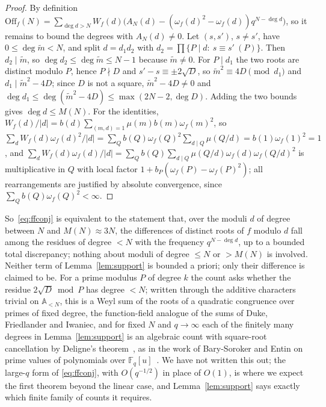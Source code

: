 \documentclass[11pt,a4paper]{article}
\theoremstyle{remark}\newtheorem{remark}[theorem]{Remark}
\newcommand{\F}{\mathbb{F}}
\newcommand{\A}{\mathbb{A}}
\begin{document}
\begin{proof}
By definition $\mathrm{Off}_f(N)=\sum_{\deg d>N}W_f(d)\bigl(A_N(d)-(\omega_f(d)^2-\omega_f(d))q^{N-\deg d}\bigr)$,
so it remains to bound the degrees with $A_N(d)\ne0$. Let $(s,s')$, $s\ne s'$, have $0\le\deg\tilde m<N$,
and split $d=d_1d_2$ with $d_2=\prod\{P\mid d:\ s\equiv s'\ (P)\}$. Then $d_2\mid\tilde m$, so
$\deg d_2\le\deg\tilde m\le N-1$ because $\tilde m\ne0$. For $P\mid d_1$ the two roots are distinct modulo
$P$, hence $P\nmid D$ and $s'-s\equiv\pm2\sqrt D$, so $\tilde m^2\equiv4D\pmod{d_1}$ and
$d_1\mid\tilde m^2-4D$; since $D$ is not a square, $\tilde m^2-4D\ne0$ and
$\deg d_1\le\deg(\tilde m^2-4D)\le\max(2N-2,\deg D)$. Adding the two bounds gives $\deg d\le M(N)$. For
the identities, $W_f(d)/|d|=b(d)\sum_{(m,d)=1}\mu(m)b(m)\omega_f(m)^2$, so
$\sum_dW_f(d)\omega_f(d)^2/|d|=\sum_Qb(Q)\omega_f(Q)^2\sum_{d\mid Q}\mu(Q/d)=b(1)\omega_f(1)^2=1$, and
$\sum_dW_f(d)\omega_f(d)/|d|=\sum_Qb(Q)\sum_{d\mid Q}\mu(Q/d)\omega_f(d)\omega_f(Q/d)^2$ is multiplicative
in $Q$ with local factor $1+b_P(\omega_f(P)-\omega_f(P)^2)$; all rearrangements are justified by absolute
convergence, since $\sum_Qb(Q)\omega_f(Q)^2<\infty$.
\end{proof}

So~\eqref{eq:ffconj} is equivalent to the statement that, over the moduli $d$ of degree between $N$ and
$M(N)\approx3N$, the differences of distinct roots of $f$ modulo $d$ fall among the residues of degree
$<N$ with the frequency $q^{N-\deg d}$, up to a bounded total discrepancy; nothing about moduli of degree
$\le N$ or $>M(N)$ is involved. Neither term of Lemma~\ref{lem:support} is bounded a priori; only their
difference is claimed to be. For a prime modulus $P$ of degree $k$ the count asks whether the residue
$2\sqrt D\bmod P$ has degree $<N$; written through the additive characters trivial on $\A_{<N}$, this is
a Weyl sum of the roots of a quadratic congruence over primes of fixed degree, the function-field
analogue of the sums of Duke, Friedlander and Iwaniec, and for fixed $N$ and $q\to\infty$ each of the
finitely many degrees in Lemma~\ref{lem:support} is an algebraic count with square-root cancellation by
Deligne's theorem~\cite{Katz1988}, as in the work of Bary-Soroker and Entin on prime values of
polynomials over $\F_q[u]$~\cite{BarySoroker2012,Entin2016}. We have not written this out; the large-$q$
form of \eqref{eq:ffconj}, with $O(q^{-1/2})$ in place of $O(1)$, is where we expect the first theorem
beyond the linear case, and Lemma~\ref{lem:support} says exactly which finite family of counts it
requires.
\end{document}
